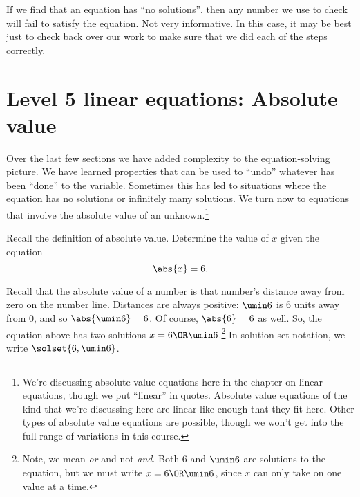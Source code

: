 If we find that an equation has ``no solutions'', then any number we use to check will fail to satisfy the equation. Not very informative. In this case, it may be best just to check back over our work to make sure that we did each of the steps correctly.

\section{Level 5 linear equations: Absolute value}
\label{sec:linearlevel5}

Over the last few sections we have added complexity to the equation-solving picture. We have learned properties that can be used to ``undo'' whatever has been ``done'' to the variable. Sometimes this has led to situations where the equation has no solutions or infinitely many solutions. We turn now to equations that involve the absolute value of an unknown.\footnote{We're discussing absolute value equations here in the chapter on linear equations, though we put ``linear'' in quotes. Absolute value equations of the kind that we're discussing here are linear-like enough that they fit here. Other types of absolute value equations are possible, though we won't get into the full range of variations in this course.}


\begin{boxexplore}
Recall the definition of absolute value. Determine the value of $x$ given the equation \[\abs{x} = 6.\]
\end{boxexplore} %

Recall that the absolute value of a number is that number's distance away from zero on the number line. Distances are always positive: $\umin6$ is 6 units away from 0, and so $\abs{\umin6}=6$. Of course, $\abs{6} = 6$ as well. So, the equation above has two solutions $x = 6 \OR \umin6$.\footnote{Note, we mean \textit{or} and not \textit{and}. Both 6 and $\umin6$ are solutions to the equation, but we must write $x=6 \OR \umin6$, since $x$ can only take on one value at a time.} In solution set notation, we write $\solset{6, \umin6}$.

